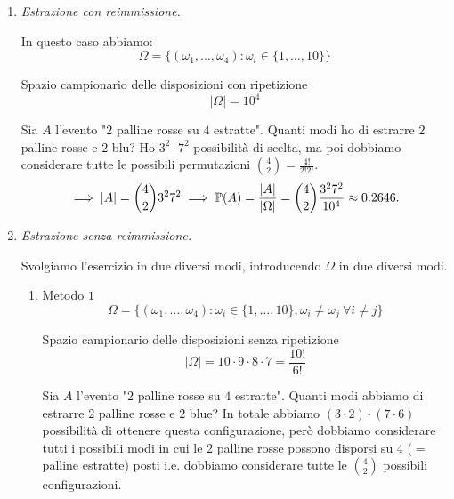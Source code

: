 \begin{enumerate}
	\item \textit{Estrazione con reimmissione.}

	In questo caso abbiamo:
	\begin{equation*}
	\Omega =\{(\omega _{1} ,\dots ,\omega _{4}) :\omega _{i} \in \{1,\dots ,10\}\}
	\end{equation*}

	Spazio campionario delle disposizioni con ripetizione
	\begin{equation*}
	| \Omega | =10^{4}
	\end{equation*}

	Sia $A$ l'evento "$2$ palline rosse su $4$ estratte". Quanti modi ho di estrarre $2$ palline rosse e $2$ blu? Ho $3^{2} \cdot 7^{2}$ possibilità di scelta, ma poi dobbiamo considerare tutte le possibili permutazioni $\binom{4}{2} =\frac{4!}{2!2!}$.
	\begin{equation*}
		\implies | A| =\binom{4}{2} 3^{2} 7^{2}\implies \mathbb{P}(A) =\frac{| A| }{| \Omega | } =\binom{4}{2}\frac{3^{2} 7^{2}}{10^{4}} \approx 0.2646.
	\end{equation*}
	\item \textit{Estrazione senza reimmissione.}

	Svolgiamo l'esercizio in due diversi modi, introducendo $\Omega $ in due diversi modi.
	\begin{enumerate}
		\item Metodo $1$
		\begin{equation*}
			\Omega =\{(\omega _{1} ,\dots ,\omega _{4}) :\omega _{i} \in \{1,\dots ,10\} ,\omega _{i} \neq \omega _{j} \ \forall i\neq j\}
		\end{equation*}

		Spazio campionario delle disposizioni senza ripetizione
		\begin{equation*}
			| \Omega | =10\cdot 9\cdot 8\cdot 7=\frac{10!}{6!}
		\end{equation*}

		Sia $A$ l'evento "$2$ palline rosse su $4$ estratte". Quanti modi abbiamo di estrarre $2$ palline rosse e $2$ blue? In totale abbiamo $(3\cdot 2) \cdot (7\cdot 6)$ possibilità di ottenere questa configurazione, però dobbiamo considerare tutti i possibili modi in cui le $2$ palline rosse possono disporsi su $4$ ($=$ palline estratte) posti i.e. dobbiamo considerare tutte le $\binom{4}{2}$ possibili configurazioni.


\end{enumerate}
\end{enumerate}
